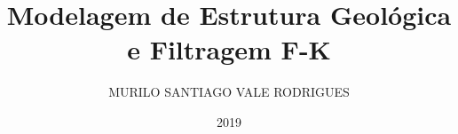 \documentclass[G]{cpgf}
\begin{document}
\title{Modelagem de Estrutura Geológica e Filtragem F-K}
\author{MURILO SANTIAGO VALE RODRIGUES} %
\date{2019}







\capa %
\rosto  %

% 



 


\tableofcontents        







% 
% 


 


\apendices 


%
\end{document}
